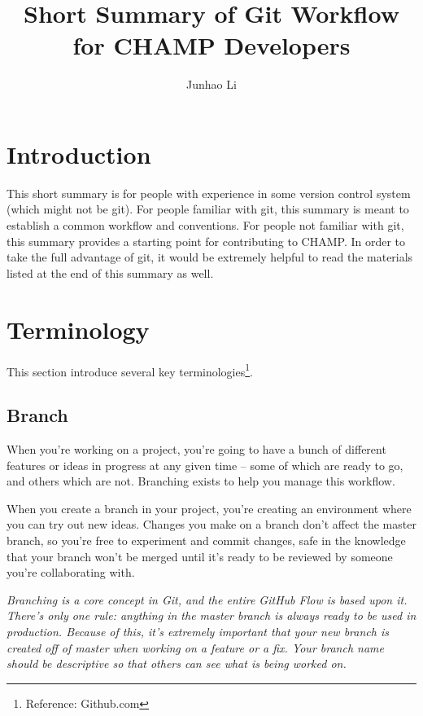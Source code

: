 \documentclass[runningheads,letterpaper]{llncs}
\begin{document}
\mainmatter
\title{Short Summary of Git Workflow for CHAMP Developers}

\author{Junhao Li}

\maketitle

\section*{Introduction}

This short summary is for people with experience in some version control system (which might not be git).
For people familiar with git, this summary is meant to establish a common workflow and conventions.
For people not familiar with git, this summary provides a starting point for contributing to CHAMP.
In order to take the full advantage of git, it would be extremely helpful to read the materials listed at the end of this summary as well.

\section{Terminology}

This section introduce several key terminologies\footnote{Reference: Github.com}.

\subsection{Branch}
When you're working on a project, you're going to have a bunch of different features or ideas in progress at any given time – some of which are ready to go, and others which are not.
Branching exists to help you manage this workflow.

When you create a branch in your project, you're creating an environment where you can try out new ideas.
Changes you make on a branch don't affect the master branch, so you're free to experiment and commit changes, safe in the knowledge that your branch won't be merged until it's ready to be reviewed by someone you're collaborating with.

{\it Branching is a core concept in Git, and the entire GitHub Flow is based upon it. There's only one rule: anything in the master branch is always ready to be used in production.
Because of this, it's extremely important that your new branch is created off of master when working on a feature or a fix.
Your branch name should be descriptive so that others can see what is being worked on.}
\end{document}
